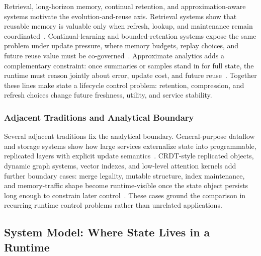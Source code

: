 \documentclass[manuscript,nonacm]{acmart}
\begin{document}
Retrieval, long-horizon memory, continual retention, and approximation-aware systems motivate the evolution-and-reuse axis. Retrieval systems show that reusable memory is valuable only when refresh, lookup, and maintenance remain coordinated~\cite{guu2020realm,lewis2020rag,borgeaud2022retro,izacard2022atlas,asai2024selfrag,wang2024hipporag,sarthi2024raptor}. Continual-learning and bounded-retention systems expose the same problem under update pressure, where memory budgets, replay choices, and future reuse value must be co-governed~\cite{kirkpatrick2017ewc,lopez2017gem,rebuffi2017icarl,chaudhry2019agem,rolnick2019experience,aljundi2019mir,buzzega2020der,hayes2020remind,prabhu2020gdumb,delange2021survey}. Approximate analytics adds a complementary constraint: once summaries or samples stand in for full state, the runtime must reason jointly about error, update cost, and future reuse~\cite{agarwal2013blinkdb,goiri2015approxhadoop,wang2018approxjoin,hu2018streamapprox,chen2018incapprox}. Together these lines make state a lifecycle control problem: retention, compression, and refresh choices change future freshness, utility, and service stability.

\subsubsection{Adjacent Traditions and Analytical Boundary}

Several adjacent traditions fix the analytical boundary. General-purpose dataflow and storage systems show how large services externalize state into programmable, replicated layers with explicit update semantics~\cite{isard2007dryad,chambers2010flumejava,murray2011ciel,chang2008bigtable,decandia2007dynamo,lakshman2010cassandra,baker2011megastore,peng2010percolator}. CRDT-style replicated objects, dynamic graph systems, vector indexes, and low-level attention kernels add further boundary cases: merge legality, mutable structure, index maintenance, and memory-traffic shape become runtime-visible once the state object persists long enough to constrain later control~\cite{shapiro2011crdt,gao2026grace,karpukhin2020dpr,khattab2020colbert,jegou2011pq,malkov2020hnsw,dao2024flashattention2}. These cases ground the comparison in recurring runtime control problems rather than unrelated applications.


\subsection{System Model: Where State Lives in a Runtime}
\end{document}
